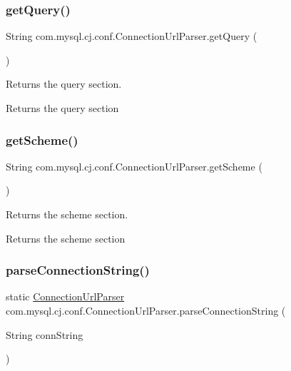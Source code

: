 \subsubsection{\texorpdfstring{get\+Query()}{getQuery()}}
{\footnotesize\ttfamily String com.\+mysql.\+cj.\+conf.\+Connection\+Url\+Parser.\+get\+Query (\begin{DoxyParamCaption}{ }\end{DoxyParamCaption})}

Returns the query section.

\begin{DoxyReturn}{Returns}
the query section 
\end{DoxyReturn}
\mbox{\label{classcom_1_1mysql_1_1cj_1_1conf_1_1_connection_url_parser_a3dcb0a44f5d1cdec45cafe6476f7d5f8}} 
\subsubsection{\texorpdfstring{get\+Scheme()}{getScheme()}}
{\footnotesize\ttfamily String com.\+mysql.\+cj.\+conf.\+Connection\+Url\+Parser.\+get\+Scheme (\begin{DoxyParamCaption}{ }\end{DoxyParamCaption})}

Returns the scheme section.

\begin{DoxyReturn}{Returns}
the scheme section 
\end{DoxyReturn}
\mbox{\label{classcom_1_1mysql_1_1cj_1_1conf_1_1_connection_url_parser_ad9c8c5abeae754a8e938861add140250}} 
\subsubsection{\texorpdfstring{parse\+Connection\+String()}{parseConnectionString()}}
{\footnotesize\ttfamily static \mbox{\hyperlink{classcom_1_1mysql_1_1cj_1_1conf_1_1_connection_url_parser}{Connection\+Url\+Parser}} com.\+mysql.\+cj.\+conf.\+Connection\+Url\+Parser.\+parse\+Connection\+String (\begin{DoxyParamCaption}\item[{String}]{conn\+String }\end{DoxyParamCaption})\hspace{0.3cm}{\ttfamily [static]}}

